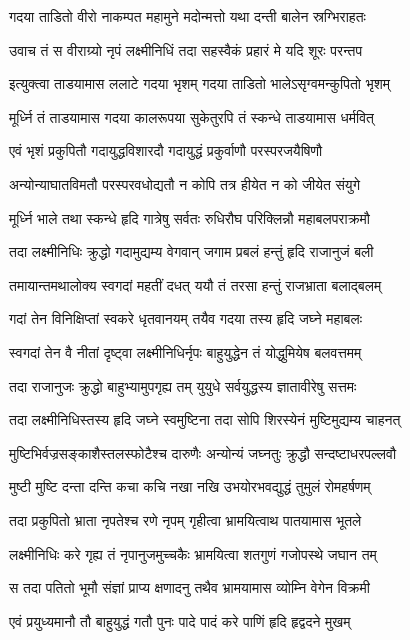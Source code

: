 \twolineshloka
{गदया ताडितो वीरो नाकम्पत महामुने}
{मदोन्मत्तो यथा दन्ती बालेन स्रग्भिराहतः}%

\twolineshloka
{उवाच तं स वीराग्र्यो नृपं लक्ष्मीनिधिं तदा}
{सहस्वैकं प्रहारं मे यदि शूरः परन्तप}%

\twolineshloka
{इत्युक्त्वा ताडयामास ललाटे गदया भृशम्}
{गदया ताडितो भालेऽसृग्वमन्कुपितो भृशम्}%

\twolineshloka
{मूर्ध्नि तं ताडयामास गदया कालरूपया}
{सुकेतुरपि तं स्कन्धे ताडयामास धर्मवित्}%

\twolineshloka
{एवं भृशं प्रकुपितौ गदायुद्धविशारदौ}
{गदायुद्धं प्रकुर्वाणौ परस्परजयैषिणौ}%

\twolineshloka
{अन्योन्याघातविमतौ परस्परवधोद्यतौ}
{न कोपि तत्र हीयेत न को जीयेत संयुगे}%

\twolineshloka
{मूर्ध्नि भाले तथा स्कन्धे हृदि गात्रेषु सर्वतः}
{रुधिरौघ परिक्लिन्नौ महाबलपराक्रमौ}%

\twolineshloka
{तदा लक्ष्मीनिधिः क्रुद्धो गदामुद्यम्य वेगवान्}
{जगाम प्रबलं हन्तुं हृदि राजानुजं बली}%

\twolineshloka
{तमायान्तमथालोक्य स्वगदां महतीं दधत्}
{ययौ तं तरसा हन्तुं राजभ्राता बलाद्बलम्}%

\twolineshloka
{गदां तेन विनिक्षिप्तां स्वकरे धृतवानयम्}
{तयैव गदया तस्य हृदि जघ्ने महाबलः}%

\twolineshloka
{स्वगदां तेन वै नीतां दृष्ट्वा लक्ष्मीनिधिर्नृपः}
{बाहुयुद्धेन तं योद्धुमियेष बलवत्तमम्}%

\twolineshloka
{तदा राजानुजः क्रुद्धो बाहुभ्यामुपगृह्य तम्}
{युयुधे सर्वयुद्धस्य ज्ञातावीरेषु सत्तमः}%

\twolineshloka
{तदा लक्ष्मीनिधिस्तस्य हृदि जघ्ने स्वमुष्टिना}
{तदा सोपि शिरस्येनं मुष्टिमुद्यम्य चाहनत्}%

\twolineshloka
{मुष्टिभिर्वज्रसङ्काशैस्तलस्फोटैश्च दारुणैः}
{अन्योन्यं जघ्नतुः क्रुद्धौ सन्दष्टाधरपल्लवौ}%

\twolineshloka
{मुष्टी मुष्टि दन्ता दन्ति कचा कचि नखा नखि}
{उभयोरभवद्युद्धं तुमुलं रोमहर्षणम्}%

\twolineshloka
{तदा प्रकुपितो भ्राता नृपतेश्च रणे नृपम्}
{गृहीत्वा भ्रामयित्वाथ पातयामास भूतले}%

\twolineshloka
{लक्ष्मीनिधिः करे गृह्य तं नृपानुजमुच्चकैः}
{भ्रामयित्वा शतगुणं गजोपस्थे जघान तम्}%

\twolineshloka
{स तदा पतितो भूमौ संज्ञां प्राप्य क्षणादनु}
{तथैव भ्रामयामास व्योम्नि वेगेन विक्रमी}%

\twolineshloka
{एवं प्रयुध्यमानौ तौ बाहुयुद्धं गतौ पुनः}
{पादे पादं करे पाणिं हृदि हृद्वदने मुखम्}%

